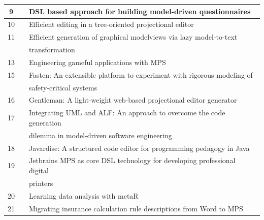 \begin{table}[htbp]
\begin{center}
\begin{tabular}{ |c  c|l | }
            9   & \cite{furtado2021dsl_SLR}              & DSL based approach for building model-driven questionnaires                 \\ \hline
            10  & \cite{beckmann2020efficient_SLR}       & Efficient editing in a tree-oriented projectional editor                    \\ \hline
            11  & \cite{kolovos2020efficient_SLR}        & Efficient generation of graphical modelviews via lazy model-to-text         \\
                &                                        & transformation                                                              \\ \hline
            13  & \cite{bucchiarone2021engineering_SLR}  & Engineering gameful applications with MPS                                   \\ \hline
            15  & \cite{ratiu2021fasten_SLR}             & Fasten: An extensible platform to experiment with rigorous modeling of      \\
                &                                        & safety-critical systems                                                     \\ \hline
            16  & \cite{lafontant2020gentleman_SLR}      & Gentleman: A light-weight web-based projectional editor generator           \\ \hline
            17  & \cite{schropfer2019integrating_SLR}    & Integrating UML and ALF: An approach to overcome the code generation        \\
                &                                        & dilemma in model-driven software engineering                                \\ \hline
            18  & \cite{santos2020javardise_SLR}         & Javardise: A structured code editor for programming pedagogy in Java        \\ \hline
            19  & \cite{schindler2021jetbrains_SLR}      & Jetbrains MPS as core DSL technology for developing professional digital    \\
                &                                        & printers                                                                    \\ \hline
            20  & \cite{simi2021learning_SLR}            & Learning data analysis with metaR                                           \\ \hline
            21  & \cite{stotz2021migrating_SLR}          & Migrating insurance calculation rule descriptions from Word to MPS          \\ \hline

\end{tabular}
\end{center}
\end{table}

